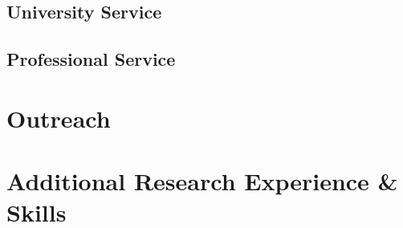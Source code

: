 \subsection*{University Service}


\subsection*{Professional Service}


\section*{Outreach}


\section*{Additional Research Experience \& Skills}


% 

% 


